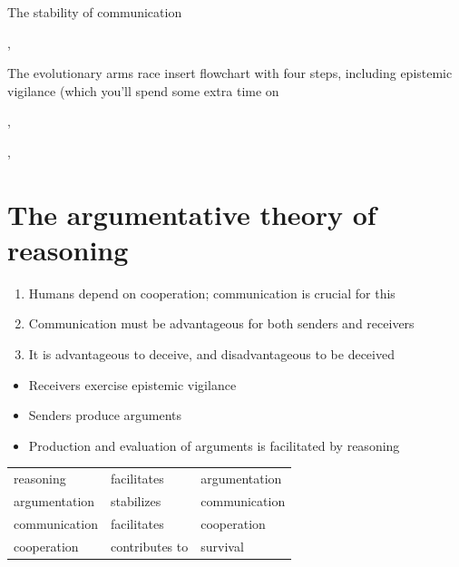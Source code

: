 \documentclass[xcolor=table]{beamer}       %
\begin{document}
\begin{frame}{The stability of communication}
\begin{center}
    \end{center}
    \scriptsize{\citet{Scott-Phillips08}, }
\end{frame}

\begin{frame}{The evolutionary arms race}
    insert flowchart with four steps, including epistemic vigilance (which you'll spend some extra time on

    \scriptsize{\citet{Sperber01}, }

    \scriptsize{\citet{Sperber10}, }
\end{frame}

\section{The argumentative theory of reasoning}

\begin{frame}{\insertsection}
    \begin{block}{\citet{MS11}}
    \begin{enumerate}[<+->]
        \item Humans depend on cooperation; communication is crucial for this
        \item Communication must be advantageous for both senders and receivers
        \item It is advantageous to deceive, and disadvantageous to be deceived
    \end{enumerate}
    \begin{itemize}[<+->]
        \item Receivers exercise epistemic vigilance
        \item Senders produce arguments
        \item Production and evaluation of arguments is facilitated by \alert{reasoning}
    \end{itemize}
    \end{block}
    \centering
    \begin{tabular}{lll}
        \pause reasoning & facilitates & argumentation \\
        \pause argumentation & stabilizes & communication \\
        \pause communication & facilitates & cooperation \\
        \pause cooperation & contributes to & survival
    \end{tabular}
\end{frame}
\end{document}
